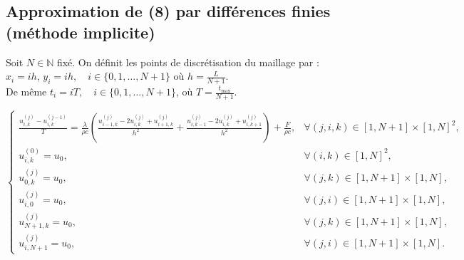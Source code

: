 \documentclass{article}
\begin{document}
\subsection{Approximation de (8) par différences finies (méthode implicite)}

Soit \( N \in \mathbb{N} \) fixé. On définit les points de discrétisation du maillage par :\\
\( x_i = ih\), \( y_i = ih, \quad i \in \{0, 1, \ldots, N + 1\} \) où \( h = \frac{L}{N + 1} \).\\De même \( t_i = iT, \quad i \in \{0, 1, \ldots, N + 1\} \), où \( T = \frac{t_{\text{max}}}{N + 1} \).

\begin{equation}
\begin{cases}
    \frac{u_{i,k}^{(j)} - u_{i,k}^{(j-1)}}{T} = \frac{\lambda}{\rho c} \left(\frac{u_{i-1,k}^{(j)} - 2u_{i,k}^{(j)} + u_{i+1,k}^{(j)}}{h^2} + \frac{u_{i,k-1}^{(j)} - 2u_{i,k}^{(j)} + u_{i,k+1}^{(j)}}{h^2}\right) + \frac{F}{\rho c}, & \forall (j, i, k) \in [1, N+1] \times [1, N]^2, \\
    u_{i,k}^{(0)} = u_0, & \forall (i, k) \in [1, N]^2, \\
    u_{0,k}^{(j)} = u_0, & \forall (j,k) \in [1,N+1] \times [1, N], \\
    u_{i,0}^{(j)}= u_0, & \forall (j, i) \in [1, N+1] \times [1, N], \\
    u_{N+1,k}^{(j)} = u_0, & \forall (j, k) \in [1, N+1] \times [1, N], \\
    u_{i,N+1}^{(j)} = u_0, & \forall (j, i) \in [1, N+1] \times [1, N].
\end{cases}
\end{equation}
\end{document}
